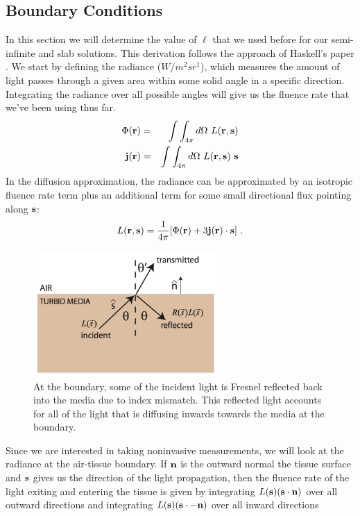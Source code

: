 \subsection{Boundary Conditions}
In this section we will determine the value of $\ell$ that we used before for our semi-infinite and slab solutions. This derivation follows the approach of Haskell's paper \cite{Haskell1994}. We start by defining the radiance ($W/m^2sr^1$), which measures the amount of light passes through a given area within some solid angle in a specific direction. Integrating the radiance over all possible angles will give us the fluence rate that we've been using thus far. 
\begin{eqnarray}
\Phi({\bf r}) &=& \int\int_{4\pi} d\Omega \ L({\bf r},{\bf s})\\
{\bf j}({\bf r}) &=& \int\int_{4\pi} d\Omega \ L({\bf r},{\bf s}) \ {\bf s}
\end{eqnarray}
In the diffusion approximation, the radiance can be approximated by an isotropic fluence rate term plus an additional term for some small directional flux pointing along ${\bf s}$:
\begin{equation}
\label{Radiance}
L({\bf r},{\bf s}) = \frac{1}{4\pi} [ \Phi({\bf r}) + 3 {\bf j}({\bf
  r}) \cdot {\bf s}] \ .
\end{equation}
\begin{figure}[htp]
\begin{center}
\includegraphics[width=7cm]{./figures/BoundaryReflect.png}
\caption{At the boundary, some of the incident light is Fresnel reflected back into the media due to index mismatch. This reflected light accounts for all of the light that is diffusing inwards towards the media at the boundary.}
\label{BoundaryReflect}
\end{center}
\end{figure}
Since we are interested in taking noninvasive measurements, we will look at the radiance at the air-tissue boundary. If ${\bf n}$ is the outward normal the tissue surface and ${\bf s}$ gives us the direction of the light propagation, then the fluence rate of the light exiting and entering the tissue is given by integrating $L({\bf s}) ({\bf s} \cdot {\bf n})$ over all outward directions and integrating  $L({\bf s}) ({\bf s} \cdot {- \bf n})$ over all inward directions
